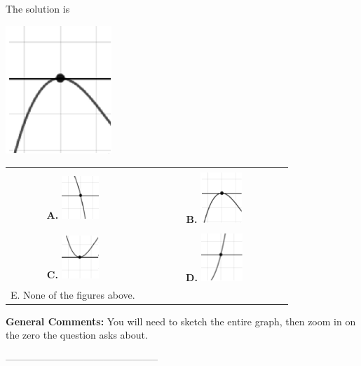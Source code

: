 \documentclass{article}[14pt]
\begin{document}
 
 The solution is  
 \begin{center} \includegraphics[width=0.3\textwidth]{../Figures/zeroBehaviorNegativeEvenC.png} \end{center}\begin{tabular}{|c|c|} 
\hline 
 & \tabularnewline 
 \textbf{A.} \includegraphics[width=0.3\textwidth]{../Figures/zeroBehaviorNegativeOddC.png} & \textbf{B.} \includegraphics[width=0.3\textwidth]{../Figures/zeroBehaviorNegativeEvenC.png} \tabularnewline 
\hline 
 & \tabularnewline 
 \textbf{C.} \includegraphics[width=0.3\textwidth]{../Figures/zeroBehaviorPositiveEvenC.png} & \textbf{D.} \includegraphics[width=0.3\textwidth]{../Figures/zeroBehaviorPositiveOddC.png} \tabularnewline 
\hline 
 E. None of the figures above. & \tabularnewline 
\hline 
 \end{tabular} 
 
\textbf{General Comments:} You will need to sketch the entire graph, then zoom in on the zero the question asks about.

-----------------------------------------------
\end{document}
